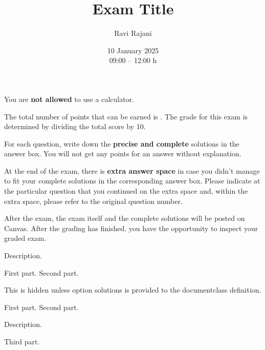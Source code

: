 \totalpts[100]
\title{Exam Title}
\author{Ravi Rajani}
\date{10 January 2025\\ 09:00 -- 12:00 h}

\maketitle
\begin{instructions}
    \item You are \textbf{not allowed} to use a calculator.

    \item The total number of points that can be earned is \totalpts. The grade for this exam is determined by dividing the total score by 10.

    \item For each question, write down the \textbf{precise and complete} solutions in the answer box. You will not get any points for an answer without explanation.

    \item At the end of the exam, there is \textbf{extra answer space} in case you didn't manage to fit your complete solutions in the corresponding answer box. Please indicate at the particular question that you continued on the extra space and, within the extra space, please refer to the original question number.

    \item After the exam, the exam itself and the complete solutions will be posted on Canvas. After the grading has finished, you have the opportunity to inspect your graded exam.
\end{instructions}
\begin{question}[8]
    Description.
    \begin{subparts}
        \subpart[4] First part.
        \subpart[1] Second part.
    \end{subparts}
\end{question}
\begin{soltn}
    This is hidden unless option \textsf{solutions} is provided to the \textsf{documentclass} definition.
\end{soltn}
\begin{question}[10]
    \nodescription
    \begin{subparts}
        \subpart[5] First part.
        \subpart[5] Second part.
    \end{subparts}
    Description.
    \begin{subparts}[resume]
        \subpart[3] Third part.
    \end{subparts}
\end{question}
